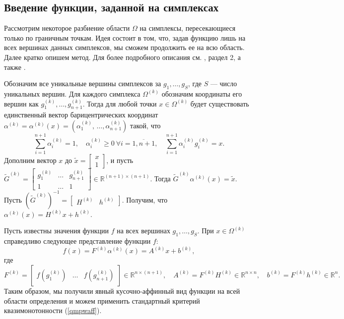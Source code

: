 \documentclass{article}
\renewcommand{\ge}{\geqslant}
\theoremstyle{definition}
\begin{document}
\subsection{Введение функции, заданной на симплексах}
Рассмотрим некоторое разбиение области \(\Omega\) на симплексы, пересекающиеся только по граничным точкам. Идея состоит в том, что, задав функцию лишь на всех вершинах данных симплексов, мы сможем продолжить ее на всю область. Далее кратко опишем метод. Для более подробного описания см. \cite{9}, раздел 2, а также \cite{10}.

Обозначим все уникальные вершины симплексов за \(g_1,\dots,g_S\), где \(S\) --- число уникальных вершин. Для каждого симплекса \(\Omega^{(k)}\) обозначим координаты его вершин как \(g^{(k)}_1,\dots,g^{(k)}_{n+1}\). Тогда для любой точки \(x \in \Omega^{(k)}\) будет существовать единственный вектор барицентрических координат \(\alpha^{(k)} = \alpha^{(k)}(x) = (\alpha^{(k)}_1,\,\dots, \alpha^{(k)}_{n+1})\) такой, что
\[\sum_{i = 1}^{n + 1} \alpha^{(k)}_i = 1,\quad \alpha^{(k)}_i \ge 0\ \forall i = \overline{1, n+1},\quad \sum_{i = 1}^{n+1} \alpha^{(k)}_i g^{(k)}_i = x.\]
Дополним вектор \(x\) до  \(\tilde{x} = \begin{bmatrix} x \\ 1 \end{bmatrix}\), и пусть \(\tilde{G}^{(k)} = \begin{bmatrix} g^{(k)}_{1} & \dots & g^{(k)}_{n+1} \\ 1 & \dots & 1 \end{bmatrix} \in \mathbb{R}^{(n + 1) \times (n + 1)}\). Тогда \(\tilde{G}^{(k)} \alpha^{(k)}(x) = \tilde x\). Пусть \((\tilde{G}^{(k)})^{-1} = \begin{bmatrix} H^{(k)} & h^{(k)} \end{bmatrix}\). Получим, что \(\alpha^{(k)}(x) = H^{(k)} x + h^{(k)} \).

Пусть известны значения функции \(f\) на всех вершинах \(g_1,\dots,g_S\). При \(x \in \Omega^{(k)}\) справедливо следующее представление функции \(f\):
\[f(x) = F^{(k)}\alpha^{(k)}(x) = A^{(k)}x + b^{(k)},\]
где \[F^{(k)} = \begin{bmatrix} f(g^{(k)}_{1}) & \dots & f(g^{(k)}_{n+1}) \end{bmatrix} \in \mathbb{R}^{n\times(n+1)},\quad A^{(k)} = F^{(k)}H^{(k)} \in \mathbb{R}^{n\times n},\quad b^{(k)} = F^{(k)}h^{(k)} \in \mathbb{R}^{n}.\]
Таким образом, мы получили явный кусочно-аффинный вид функции на всей области определения и можем применить стандартный критерий квазимонотонности (\ref{qmpwaff}). 
\end{document}
